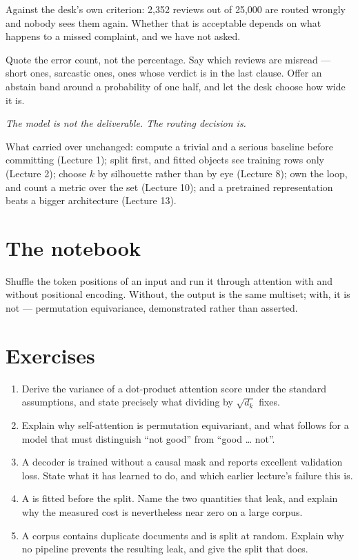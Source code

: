\documentclass[11pt,a4paper]{article}
\begin{document}
Against the desk's own criterion: 2{,}352 reviews out of 25{,}000 are routed
wrongly and nobody sees them again. Whether that is acceptable depends on what
happens to a missed complaint, and we have not asked.

\begin{keybox}[title={What a defensible report says}]
Quote the error count, not the percentage. Say which reviews are misread ---
short ones, sarcastic ones, ones whose verdict is in the last clause. Offer an
abstain band around a probability of one half, and let the desk choose how wide
it is.

\emph{The model is not the deliverable. The routing decision is.}
\end{keybox}

What carried over unchanged: compute a trivial and a serious baseline before
committing (Lecture 1); split first, and fitted objects see training rows only
(Lecture 2); choose $k$ by silhouette rather than by eye (Lecture 8); own the
loop, and count a metric over the set (Lecture 10); and a pretrained
representation beats a bigger architecture (Lecture 13).

\section{The notebook}

\begin{trybox}[title={What to change}]
Shuffle the token positions of an input and run it through attention with and
without positional encoding. Without, the output is the same multiset; with, it
is not --- permutation equivariance, demonstrated rather than asserted.
\end{trybox}

\section{Exercises}

\begin{enumerate}[leftmargin=1.6em,itemsep=4pt]
  \item Derive the variance of a dot-product attention score under the standard
        assumptions, and state precisely what dividing by $\sqrt{d_k}$ fixes.
        \hfill \scope{[5]}
  \item Explain why self-attention is permutation equivariant, and what follows
        for a model that must distinguish ``not good'' from ``good \ldots
        not''. \hfill \scope{[4]}
  \item A decoder is trained without a causal mask and reports excellent
        validation loss. State what it has learned to do, and which earlier
        lecture's failure this is. \hfill \scope{[4]}
  \item A  is fitted before the split. Name the two
        quantities that leak, and explain why the measured cost is nevertheless
        near zero on a large corpus. \hfill \scope{[5]}
  \item A corpus contains duplicate documents and is split at random. Explain
        why no pipeline prevents the resulting leak, and give the split that
        does. \hfill \scope{[4]}
\end{enumerate}
\end{document}
